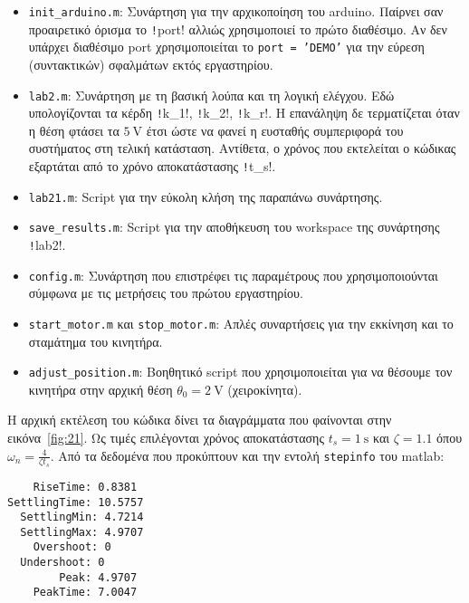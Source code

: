 \begin{itemize}
\item \texttt{init\_arduino.m}: Συνάρτηση για την αρχικοποίηση του arduino.
  Παίρνει σαν προαιρετικό όρισμα το \texttt!port! αλλιώς χρησιμοποιεί το πρώτο διαθέσιμο.
  Αν δεν υπάρχει διαθέσιμο port χρησιμοποιείται το \texttt{port = 'DEMO'} για την εύρεση (συντακτικών)
  σφαλμάτων εκτός εργαστηρίου.

\item \texttt{lab2.m}: Συνάρτηση με τη βασική λούπα και τη λογική ελέγχου.
  Εδώ υπολογίζονται τα κέρδη \texttt!k_1!, \texttt!k_2!, \texttt!k_r!.
  Η επανάληψη δε τερματίζεται όταν η θέση φτάσει τα $\SI{5}{\volt}$ έτσι ώστε να φανεί η ευσταθής συμπεριφορά του συστήματος στη τελική κατάσταση.
  Αντίθετα, ο χρόνος που εκτελείται ο κώδικας εξαρτάται από το χρόνο αποκατάστασης \texttt!t_s!.

\item \texttt{lab21.m}: Script για την εύκολη κλήση της παραπάνω συνάρτησης.

\item \texttt{save\_results.m}: Script για την αποθήκευση του workspace της συνάρτησης \texttt!lab2!.

\item \texttt{config.m}: Συνάρτηση που επιστρέφει τις παραμέτρους που χρησιμοποιούνται σύμφωνα με τις μετρήσεις του πρώτου εργαστηρίου.

\item \texttt{start\_motor.m} και \texttt{stop\_motor.m}: Απλές συναρτήσεις για την εκκίνηση και το σταμάτημα του κινητήρα.

\item \texttt{adjust\_position.m}: Βοηθητικό script που χρησιμοποιείται για να θέσουμε τον κινητήρα στην αρχική θέση $\theta_0 = \SI{2}{\volt}$ (χειροκίνητα).
\end{itemize}

Η αρχική εκτέλεση του κώδικα δίνει τα διαγράμματα που φαίνονται στην εικόνα~\ref{fig:21}.
Ως τιμές επιλέγονται χρόνος αποκατάστασης $t_s = \SI{1}{\second}$ και $\zeta = 1.1$
όπου $\omega_n = \frac{4}{\zeta t_s}$.
Από τα δεδομένα που προκύπτουν και την εντολή \texttt{stepinfo} του matlab:
\begin{code}
\begin{verbatim}
    RiseTime: 0.8381
SettlingTime: 10.5757
  SettlingMin: 4.7214
  SettlingMax: 4.9707
    Overshoot: 0
  Undershoot: 0
        Peak: 4.9707
    PeakTime: 7.0047
\end{verbatim}
\end{code}

